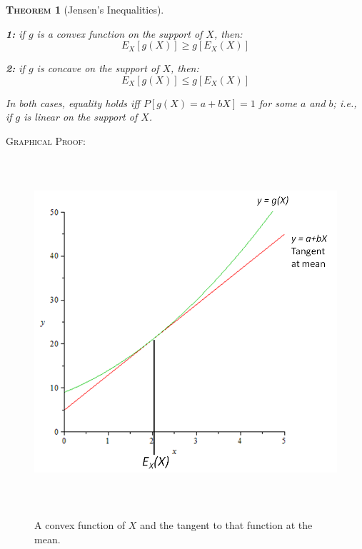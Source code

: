 \documentclass[12pt,a4paper]{article}
\newtheorem{theorem}{\textsc{Theorem}}[section]
\begin{document}
\begin{theorem}[Jensen's Inequalities]$\;$\par\vspace{1cm}

{\bf 1: } if $g$ is a convex function on the support of $X$, then:
$$E_X[g(X)] \geq g[E_X(X)]$$\par\vspace{1cm}

{\bf 2: } if $g$ is concave on the support of $X$, then:
$$E_X[g(X)] \leq g[E_X(X)]$$\par\vspace{1cm}

In both cases, equality holds iff $P[g(X) = a+bX] = 1$ for some $a$ and $b$; i.e., if $g$ is linear on the support of $X$.

\end{theorem}

\noindent\textsc{Graphical Proof:}\par\vspace{1cm}

\begin{figure}[h]
\begin{center}
\includegraphics[height=12.86cm,width=13.8cm]{M2S1 Jensen's Inequalities.png}\label{jensen}
\caption{A convex function of $X$ and the tangent to that function at the mean.}
\end{center}
\end{figure}
\end{document}
